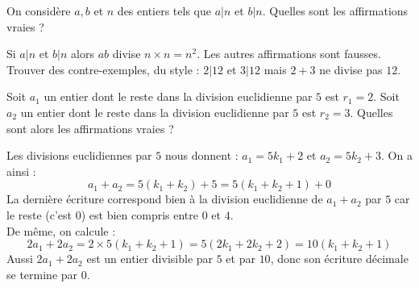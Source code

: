 \begin{question}
    On considère $a,b$ et $n$ des entiers tels que $a | n$ et $b | n$.
    Quelles sont les affirmations vraies ?
    \begin{answers} 
    \end{answers}
    \begin{explanations} 
    Si $a | n$ et $b | n$ alors $ab$ divise $n \times n  = n^2$. Les autres affirmations sont fausses. Trouver des contre-exemples, du style : $2|12$ et $3|12$ mais $2+3$ ne divise pas $12$.
    \end{explanations}
\end{question}


\begin{question}
    Soit $a_1$ un entier dont le reste dans la division euclidienne par $5$ est $r_1 = 2$. Soit $a_2$ un entier dont le reste dans la division euclidienne par $5$ est $r_2 = 3$. Quelles sont alors les affirmations vraies ?
    \begin{answers} 
    \end{answers}
    \begin{explanations} 
    Les divisions euclidiennes par $5$ nous donnent : $a_1 = 5k_1 + 2$ et $a_2 = 5k_2 + 3$. On a ainsi :
    $$ a_1 + a_2 = 5(k_1+k_2) + 5 = 5(k_1+k_2+1) + 0 $$
    La dernière écriture correspond bien à la division euclidienne de $a_1 + a_2$ par $5$ car le reste (c'est $0$) est bien compris entre $0$ et $4$.\\
    De même, on calcule :
    $$ 2a_1 + 2a_2 = 2 \times 5(k_1+k_2+1) = 5 (2k_1 + 2k_2 + 2) = 10 (k_1 + k_2 + 1) $$
    Aussi $2a_1 + 2a_2$ est un entier divisible par $5$ et par $10$, donc son écriture décimale se termine par $0$.
    \end{explanations}
\end{question}



